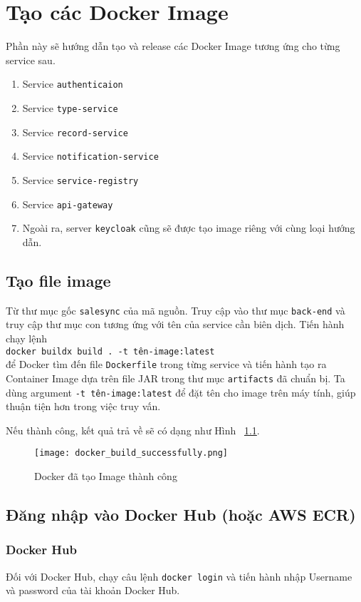 \chapter{Tạo các Docker Image}
\label{Chapter2}
Phần này sẽ hướng dẫn tạo và release các Docker Image tương ứng cho từng service sau.
\begin{enumerate}
    \item Service \texttt{{authenticaion}}
    \item Service \texttt{type-service}
    \item Service \texttt{record-service}
    \item Service \texttt{notification-service}
    \item Service \texttt{service-registry}
    \item Service \texttt{api-gateway}
    \item Ngoài ra, server \texttt{keycloak} cũng sẽ được tạo image riêng với cùng loại hướng dẫn.
\end{enumerate}

\section{Tạo file image}
Từ thư mục gốc \texttt{salesync} của mã nguồn. Truy cập vào thư mục \texttt{back-end} và truy cập thư mục con tương ứng với tên của service cần biên dịch.
Tiến hành chạy lệnh \\
\texttt{docker buildx build . -t tên-image:latest}\\
để Docker tìm đến file \texttt{Dockerfile} trong từng service và tiến hành tạo ra Container Image dựa trên file JAR trong thư mục \texttt{artifacts} đã chuẩn bị. Ta dùng argument \texttt{-t tên-image:latest} để đặt tên cho image trên máy tính, giúp thuận tiện hơn trong việc truy vấn.

Nếu thành công, kết quả trả về sẽ có dạng như Hình ~\ref{fig:docker_build_successfully}.

\begin{figure}
    \centering
    \texttt{[image: docker\_build\_successfully.png]}
    \caption{Docker đã tạo Image thành công}
    \label{fig:docker_build_successfully}
\end{figure}

\section{Đăng nhập vào Docker Hub (hoặc AWS ECR)}
\subsection{Docker Hub}
Đối với Docker Hub, chạy câu lệnh \texttt{docker login} và tiến hành nhập Username và password của tài khoản Docker Hub.

